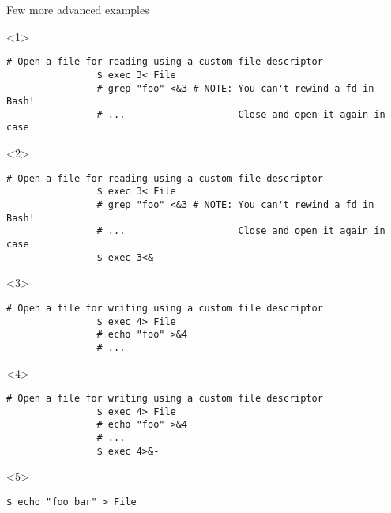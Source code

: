 \begin{frame}[fragile]{Few more advanced examples}
    \vspace{-5mm}
    \begin{overlayarea}{\textwidth}{0.34\textheight}
        \begin{onlyenv}<1>
            \begin{lstlisting}[style=MyBash, numbers=none, xrightmargin=3mm]
                # Open a file for reading using a custom file descriptor
                $ exec 3< File
                # grep "foo" <&3 # NOTE: You can't rewind a fd in Bash!
                # ...                    Close and open it again in case
            \end{lstlisting}
        \end{onlyenv}
        \begin{onlyenv}<2>
            \begin{lstlisting}[style=MyBash, numbers=none, xrightmargin=3mm]
                # Open a file for reading using a custom file descriptor
                $ exec 3< File
                # grep "foo" <&3 # NOTE: You can't rewind a fd in Bash!
                # ...                    Close and open it again in case
                $ exec 3<&-
            \end{lstlisting}
        \end{onlyenv}
        \begin{onlyenv}<3>
            \begin{lstlisting}[style=MyBash, numbers=none, xrightmargin=3mm]
                # Open a file for writing using a custom file descriptor
                $ exec 4> File
                # echo "foo" >&4 
                # ...
            \end{lstlisting}
        \end{onlyenv}
        \begin{onlyenv}<4>
            \begin{lstlisting}[style=MyBash, numbers=none, xrightmargin=3mm]
                # Open a file for writing using a custom file descriptor
                $ exec 4> File
                # echo "foo" >&4 
                # ...
                $ exec 4>&-
            \end{lstlisting}
        \end{onlyenv}
        \begin{onlyenv}<5>
            \begin{lstlisting}[style=MyBash, numbers=none, xrightmargin=3mm]
                $ echo "foo bar" > File

\end{lstlisting}
\end{onlyenv}
\end{overlayarea}
\end{frame}
